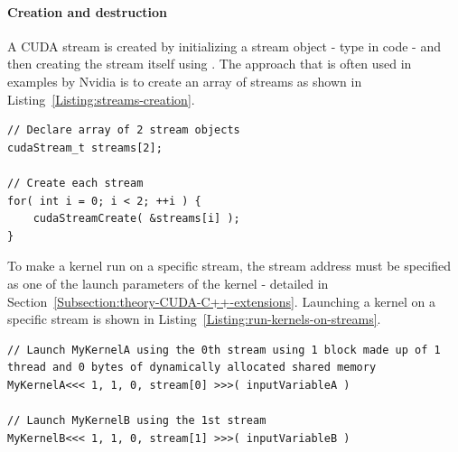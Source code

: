 \paragraph{Creation and destruction}
A CUDA stream is created by initializing a stream object - type  in code - and then creating the stream itself using . The approach that is often used in examples by Nvidia is to create an array of streams as shown in Listing~\ref{Listing:streams-creation}.

\begin{lstlisting}[caption={Creation of streams. Taken from Nvidia's \emph{CUDA C++ Programming Guide} \cite{NVIDIAMay2022}.},label={Listing:streams-creation}]
// Declare array of 2 stream objects
cudaStream_t streams[2];

// Create each stream
for( int i = 0; i < 2; ++i ) {
	cudaStreamCreate( &streams[i] );
}
\end{lstlisting}

To make a kernel run on a specific stream, the stream address must be specified as one of the launch parameters of the kernel - detailed in Section~\ref{Subsection:theory-CUDA-C++-extensions}. Launching a kernel on a specific stream is shown in Listing~\ref{Listing:run-kernels-on-streams}.

\begin{lstlisting}[caption={Pseudo-code for launching two different kernels using two different streams. The instructions in this example would be executed from the host. Since each kernel is essentially an open door to the device for instructions, then, once \code{MyKernelA} is launched on \code{stream[0]}, the control is returned to the host without waiting for \code{MyKernelA} to finish. Subsequently, the host will immediately launch \code{MyKernelB} using \code{stream[1]}. In this example, each kernel is launched on a grid made up of one single-thread block with 0 bytes of dynamic shared memory allocated, thus, the device's resources will not be exhausted and both kernels will run concurrently. Taken from Nvidia's \emph{CUDA C++ Programming Guide} \cite{NVIDIAMay2022}.},label={Listing:run-kernels-on-streams}]
// Launch MyKernelA using the 0th stream using 1 block made up of 1 thread and 0 bytes of dynamically allocated shared memory
MyKernelA<<< 1, 1, 0, stream[0] >>>( inputVariableA )

// Launch MyKernelB using the 1st stream
MyKernelB<<< 1, 1, 0, stream[1] >>>( inputVariableB )
\end{lstlisting}

